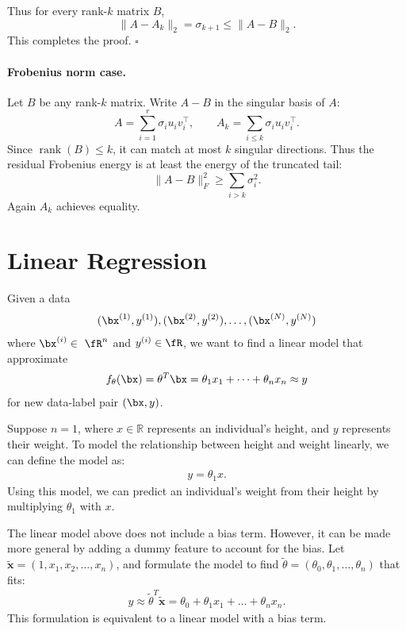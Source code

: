 \documentclass{article}
\begin{document}
Thus for every rank-$k$ matrix $B$,
\[
\|A-A_k\|_2 = \sigma_{k+1} \le \|A-B\|_2.
\]
This completes the proof.
\hfill $\square$


\paragraph{Frobenius norm case.}
Let $B$ be any rank-$k$ matrix.  
Write $A - B$ in the singular basis of $A$:
\[
A = \sum_{i=1}^r \sigma_i u_i v_i^\top, \qquad
A_k = \sum_{i\le k} \sigma_i u_i v_i^\top.
\]
Since $\operatorname{rank}(B)\le k$, it can match at most $k$ singular directions.  
Thus the residual Frobenius energy is at least the energy of the truncated tail:
\[
\|A-B\|_F^2 \ge \sum_{i>k} \sigma_i^2.
\]
Again $A_k$ achieves equality.



\section{Linear Regression}\label{subsec:linear regression}
Given a data
\begin{align}
    (\bx^{(1)}, y^{(1)}), (\bx^{(2)}, y^{(2)}), \dots,  (\bx^{(N)}, y^{(N)})
\end{align}
where $\bx^{(i)}\in\ \fR^{n}$ and $y^{(i)}\in\fR$,
we want to find a linear model that approximate 
\begin{align}
    f_{\theta}(\bx) = \theta^T \bx = \theta_1x_1 + \dots +\theta_n x_n \approx y
\end{align}
for new data-label pair $(\bx, y)$.

\begin{example}
Suppose $n = 1$, where $x \in \mathbb{R}$ represents an individual's height, and $y$ represents their weight.
To model the relationship between height and weight linearly, we can define the model as:
\begin{align}
    y = \theta_1 x.
\end{align}
Using this model, we can predict an individual's weight from their height by multiplying $\theta_1$ with $x$.
\end{example}

\begin{remark}
The linear model above does not include a bias term.
However, it can be made more general by adding a dummy feature to account for the bias.
Let $\tilde{\mathbf{x}} = (1, x_1, x_2, \dots, x_n)$, and formulate the model to find 
$\tilde{\theta} = (\theta_0, \theta_1, \dots, \theta_n)$ that fits:
\begin{align}
y \approx \tilde{\theta}^T \tilde{\mathbf{x}} = \theta_0 + \theta_1 x_1 + \dots + \theta_n x_n.
\end{align}
This formulation is equivalent to a linear model with a bias term.
\end{remark}
\end{document}
